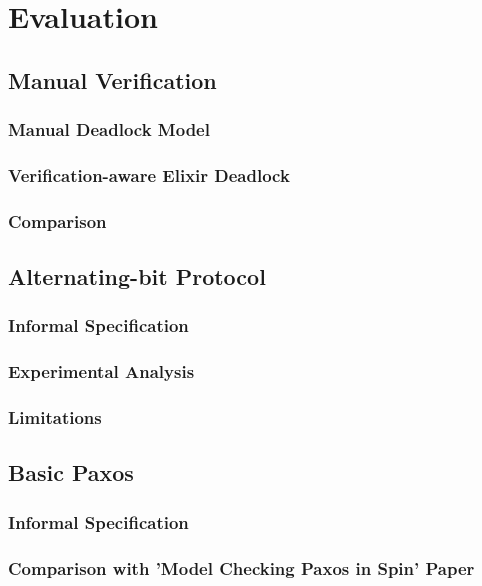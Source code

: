 \chapter{Evaluation}
\section{Manual Verification}
\subsection{Manual Deadlock Model}
\subsection{Verification-aware Elixir Deadlock}
\subsection{Comparison}
\section{Alternating-bit Protocol}
\subsection{Informal Specification}
\subsection{Experimental Analysis}
\subsection{Limitations}
\section{Basic Paxos}
\subsection{Informal Specification}
\subsection{Comparison with 'Model Checking Paxos in Spin' Paper}
